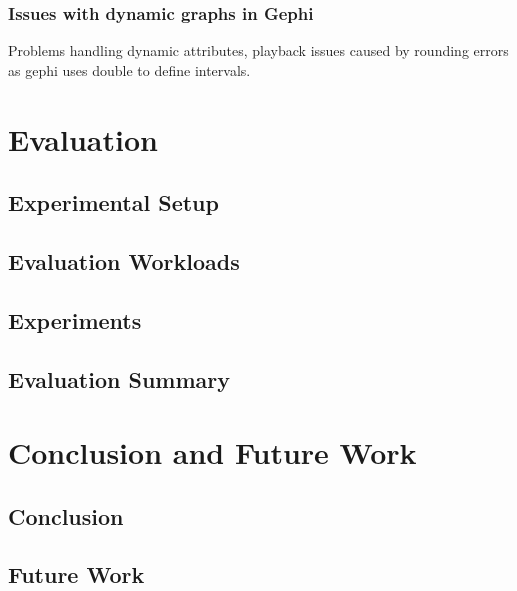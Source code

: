 \documentclass[UKenglish, a4paper]{ifimaster}
\begin{document}
    \subsection{Issues with dynamic graphs in Gephi}
        Problems handling dynamic attributes, playback issues caused by
        rounding errors as gephi uses double to define intervals.

\chapter{Evaluation}
\label{ch:evaluation}
    \section{Experimental Setup}
    \section{Evaluation Workloads}
    \section{Experiments}
    \section{Evaluation Summary}

\chapter{Conclusion and Future Work}
\label{ch:conclusion-and-future-work}
    \section{Conclusion}
    \section{Future Work}


\backmatter{}
\printbibliography{}
\end{document}
